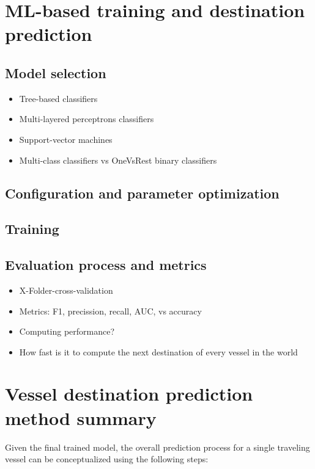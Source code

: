 \section{ML-based training and destination prediction}

\subsection{Model selection}

\begin{itemize}
    \item Tree-based classifiers
    \item Multi-layered perceptrons classifiers
    \item Support-vector machines
    \item Multi-class classifiers vs OneVsRest binary classifiers
\end{itemize}

\subsection{Configuration and parameter optimization}

\subsection{Training}

\subsection{Evaluation process and metrics}

\begin{itemize}
    \item X-Folder-cross-validation
    \item Metrics: F1, precission, recall, AUC, vs accuracy
    \item Computing performance?
    \item How fast is it to compute the next destination of every vessel in the world
\end{itemize}

\section{Vessel destination prediction method summary}

Given the final trained model, the overall prediction process for a single traveling vessel can be conceptualized using the following steps:


